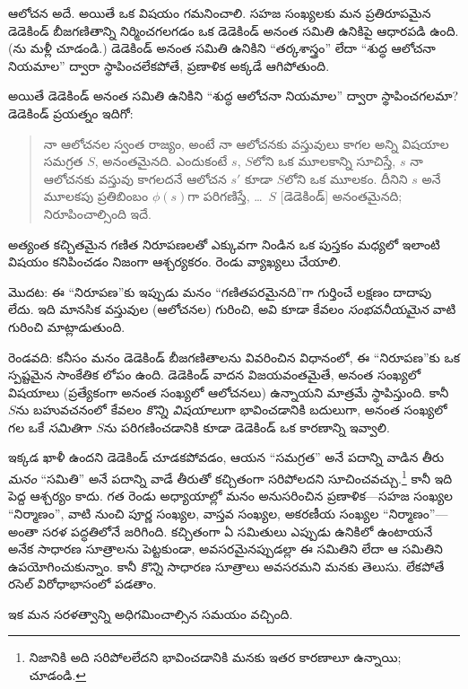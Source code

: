\documentclass[../../../include/open-logic-section]{subfiles}
\begin{document}
ఆలోచన అదే. అయితే ఒక విషయం గమనించాలి. సహజ సంఖ్యలకు మన ప్రతిరూపమైన
డెడెకిండ్ బీజగణితాన్ని నిర్మించగలగడం ఒక డెడెకిండ్ అనంత సమితి ఉనికిపై ఆధారపడి
ఉంది. (ను
మళ్లీ చూడండి.) డెడెకిండ్ అనంత సమితి ఉనికిని ``తర్కశాస్త్రం'' లేదా
``శుద్ధ ఆలోచనా నియమాల'' ద్వారా స్థాపించలేకపోతే, ప్రణాళిక అక్కడే
ఆగిపోతుంది.

అయితే డెడెకిండ్ అనంత సమితి ఉనికిని ``శుద్ధ ఆలోచనా నియమాల'' ద్వారా
స్థాపించగలమా? డెడెకిండ్ ప్రయత్నం ఇదిగో:
\begin{quote}
  నా ఆలోచనల స్వంత రాజ్యం, అంటే నా ఆలోచనకు వస్తువులు కాగల అన్ని
  విషయాల సమగ్రత $S$, అనంతమైనది. ఎందుకంటే $s$, $S$లోని ఒక మూలకాన్ని
  సూచిస్తే, $s$ నా ఆలోచనకు వస్తువు కాగలదనే ఆలోచన $s'$ కూడా
  $S$లోని ఒక మూలకం. దీనిని $s$ అనే మూలకపు ప్రతిబింబం $\phi(s)$గా
  పరిగణిస్తే, \dots~$S$ [డెడెకిండ్] అనంతమైనది; నిరూపించాల్సింది ఇదే.
	\citep[\S66]{Dedekind1888}
\end{quote}
అత్యంత కచ్చితమైన గణిత నిరూపణలతో ఎక్కువగా నిండిన ఒక పుస్తకం మధ్యలో
ఇలాంటి విషయం కనిపించడం నిజంగా ఆశ్చర్యకరం. రెండు వ్యాఖ్యలు చేయాలి.

మొదట: ఈ ``నిరూపణ''కు ఇప్పుడు మనం ``గణితపరమైనది''గా గుర్తించే లక్షణం
దాదాపు లేదు. ఇది మానసిక వస్తువుల (ఆలోచనల) గురించి, అవి కూడా కేవలం
\emph{సంభవనీయమైన} వాటి గురించి మాట్లాడుతుంది.

రెండవది: కనీసం మనం డెడెకిండ్ బీజగణితాలను వివరించిన విధానంలో, ఈ
``నిరూపణ''కు ఒక స్పష్టమైన సాంకేతిక లోపం ఉంది. డెడెకిండ్ వాదన విజయవంతమైతే,
అనంత సంఖ్యలో విషయాలు (ప్రత్యేకంగా అనంత సంఖ్యలో ఆలోచనలు) ఉన్నాయని మాత్రమే స్థాపిస్తుంది.
కానీ $S$ను బహువచనంలో కేవలం \emph{కొన్ని విషయాలు}గా భావించడానికి బదులుగా,
అనంత సంఖ్యలో  గల ఒకే \emph{సమితి}గా $S$ను పరిగణించడానికి కూడా డెడెకిండ్
ఒక కారణాన్ని ఇవ్వాలి.

ఇక్కడ ఖాళీ ఉందని డెడెకిండ్ చూడకపోవడం, ఆయన ``సమగ్రత'' అనే పదాన్ని
వాడిన తీరు \emph{మనం} ``సమితి'' అనే పదాన్ని వాడే తీరుతో కచ్చితంగా
సరిపోలదని సూచించవచ్చు.\footnote{నిజానికి అది సరిపోలలేదని భావించడానికి
మనకు ఇతర కారణాలూ ఉన్నాయి; \citet[p.~23]{Potter2004} చూడండి.}
కానీ ఇది పెద్ద ఆశ్చర్యం కాదు. గత రెండు అధ్యాయాల్లో మనం అనుసరించిన
ప్రణాళిక---సహజ సంఖ్యల ``నిర్మాణం'', వాటి నుంచి పూర్ణ సంఖ్యల, వాస్తవ సంఖ్యల,
అకరణీయ సంఖ్యల ``నిర్మాణం''---అంతా సరళ పద్ధతిలోనే జరిగింది. కచ్చితంగా
ఏ సమితులు ఎప్పుడు ఉనికిలో ఉంటాయనే అనేక సాధారణ సూత్రాలను పెట్టకుండా,
అవసరమైనప్పుడల్లా ఈ సమితిని లేదా ఆ సమితిని ఉపయోగించుకున్నాం. కానీ
\emph{కొన్ని} సాధారణ సూత్రాలు అవసరమని మనకు తెలుసు. లేకపోతే రసెల్
విరోధాభాసంలో పడతాం.

ఇక మన సరళత్వాన్ని అధిగమించాల్సిన సమయం వచ్చింది.
\end{document}
